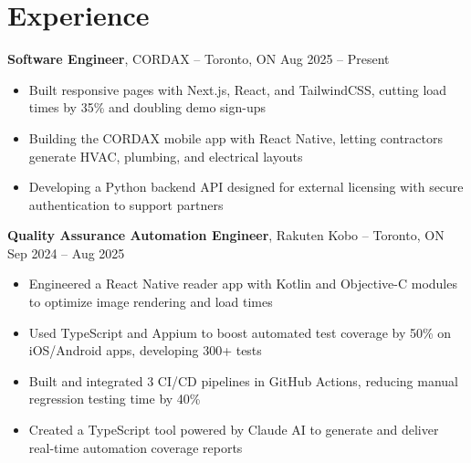 

\section*{Experience}
\textbf{Software Engineer}, {CORDAX} -- Toronto, ON \hfill Aug 2025 -- Present \\
\vspace{-5pt}
\begin{itemize}
  \item Built responsive pages with Next.js, React, and TailwindCSS, cutting load times by 35\% and doubling demo sign-ups
  \item Building the CORDAX mobile app with React Native, letting contractors generate HVAC, plumbing, and electrical layouts
  \item Developing a Python backend API designed for external licensing with secure authentication to support partners
\end{itemize}

\textbf{Quality Assurance Automation Engineer}, {Rakuten Kobo} -- Toronto, ON \hfill Sep 2024 -- Aug 2025 \\
\vspace{-5pt}
\begin{itemize}
  \item Engineered a React Native reader app with Kotlin and Objective-C modules to optimize image rendering and load times
  \item Used TypeScript and Appium to boost automated test coverage by 50\% on iOS/Android apps, developing 300+ tests
  \item Built and integrated 3 CI/CD pipelines in GitHub Actions, reducing manual regression testing time by 40\%
  \item Created a TypeScript tool powered by Claude AI to generate and deliver real-time automation coverage reports
\end{itemize}

